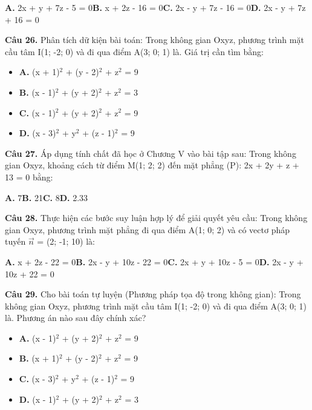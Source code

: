 \documentclass[11pt,a4paper]{article}
\begin{document}
\hspace*{1.5em}\textbf{A.} 2x + y + 7z - 5 = 0\quad\quad \textbf{B.} x + 2z - 16 = 0\quad\quad \textbf{C.} 2x - y + 7z - 16 = 0\quad\quad \textbf{D.} 2x - y + 7z + 16 = 0\par\vspace{2pt}
\textbf{\color{primary} Câu 26.} Phân tích dữ kiện bài toán: Trong không gian Oxyz, phương trình mặt cầu tâm I(1; -2; 0) và đi qua điểm A(3; 0; 1) là. Giá trị cần tìm bằng:\par
\begin{itemize}\setlength{\itemsep}{1pt}\setlength{\parskip}{0pt}
  \item[] \textbf{A.} (x + 1)$^2$ + (y - 2)$^2$ + z$^2$ = 9
  \item[] \textbf{B.} (x - 1)$^2$ + (y + 2)$^2$ + z$^2$ = 3
  \item[] \textbf{C.} (x - 1)$^2$ + (y + 2)$^2$ + z$^2$ = 9
  \item[] \textbf{D.} (x - 3)$^2$ + y$^2$ + (z - 1)$^2$ = 9
\end{itemize}\vspace{2pt}
\textbf{\color{primary} Câu 27.} Áp dụng tính chất đã học ở Chương V vào bài tập sau: Trong không gian Oxyz, khoảng cách từ điểm M(1; 2; 2) đến mặt phẳng (P): 2x + 2y + z + 13 = 0 bằng:\par
\hspace*{1.5em}\textbf{A.} 7\quad\quad \textbf{B.} 21\quad\quad \textbf{C.} 8\quad\quad \textbf{D.} 2.33\par\vspace{2pt}
\textbf{\color{primary} Câu 28.} Thực hiện các bước suy luận hợp lý để giải quyết yêu cầu: Trong không gian Oxyz, phương trình mặt phẳng đi qua điểm A(1; 0; 2) và có vectơ pháp tuyến $\vec{n}$ = (2; -1; 10) là:\par
\hspace*{1.5em}\textbf{A.} x + 2z - 22 = 0\quad\quad \textbf{B.} 2x - y + 10z - 22 = 0\quad\quad \textbf{C.} 2x + y + 10z - 5 = 0\quad\quad \textbf{D.} 2x - y + 10z + 22 = 0\par\vspace{2pt}
\textbf{\color{primary} Câu 29.} Cho bài toán tự luyện (Phương pháp tọa độ trong không gian): Trong không gian Oxyz, phương trình mặt cầu tâm I(1; -2; 0) và đi qua điểm A(3; 0; 1) là. Phương án nào sau đây chính xác?\par
\begin{itemize}\setlength{\itemsep}{1pt}\setlength{\parskip}{0pt}
  \item[] \textbf{A.} (x - 1)$^2$ + (y + 2)$^2$ + z$^2$ = 9
  \item[] \textbf{B.} (x + 1)$^2$ + (y - 2)$^2$ + z$^2$ = 9
  \item[] \textbf{C.} (x - 3)$^2$ + y$^2$ + (z - 1)$^2$ = 9
  \item[] \textbf{D.} (x - 1)$^2$ + (y + 2)$^2$ + z$^2$ = 3
\end{itemize}\vspace{2pt}
\end{document}
